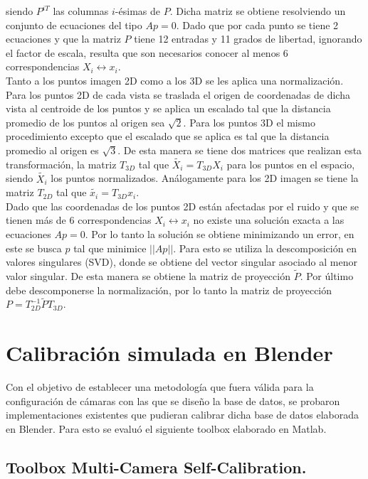  siendo $P^{iT}$ las columnas $i$-ésimas de $P$. Dicha matriz se obtiene resolviendo un conjunto de ecuaciones del tipo $Ap=0$.  Dado que por cada punto se tiene 2 ecuaciones y que la matriz $P$ tiene 12 entradas y 11 grados de libertad, ignorando el factor de escala, resulta que son necesarios conocer al menos 6 correspondencias $X_i \leftrightarrow x_i$.\\
 
 Tanto a los puntos imagen 2D como a los 3D se les aplica una normalización. Para los puntos 2D de cada vista se traslada el origen de coordenadas de dicha vista al centroide de los puntos y se aplica un escalado tal que la distancia promedio de los puntos al origen sea $\sqrt{2}$. Para los puntos 3D el mismo procedimiento excepto que el escalado que se aplica es tal que la distancia promedio al origen es $\sqrt{3}$. De esta manera se tiene dos matrices que realizan esta transformación, la matriz $T_{3D}$ tal que $\tilde{X_i} = T_{3D}^{}X_i$ para los puntos en el espacio, siendo $\tilde{X_i}$ los puntos normalizados. Análogamente para los 2D imagen se tiene la matriz $T_{2D}^{}$ tal que $\tilde{x_i} = T_{3D}^{}x_i$. \\
 
 Dado que las coordenadas de los puntos 2D están afectadas por el ruido y que se tienen más de 6 correspondencias $X_i \leftrightarrow x_i$ no existe una solución exacta a las ecuaciones $Ap=0$. Por lo tanto la solución se obtiene minimizando un error, en este se busca $p$ tal que minimice $||Ap||$. Para esto se utiliza la descomposición en valores singulares (SVD), donde se obtiene del vector singular asociado al menor valor singular. De esta manera se obtiene la matriz de proyección $\tilde{P}$. Por último debe descomponerse la normalización, por lo tanto la matriz de proyección $P = T_{2D}^{-1} \tilde{P} T_{3D}^{}$.
 
 \section{Calibración simulada en Blender}
 
 Con el objetivo de establecer una metodología que fuera válida para la configuración de cámaras con las que se diseño la base de datos, se probaron implementaciones existentes que pudieran calibrar dicha base de datos elaborada en Blender. Para esto se evaluó el siguiente toolbox elaborado en Matlab.\\ 
 
  \subsection{Toolbox Multi-Camera Self-Calibration.} 
 

